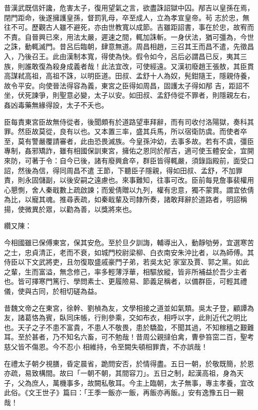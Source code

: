 \begin{pinyinscope}
 昔漢武既信奸讒，危害太子，復用望氣之言，欲盡誅詔獄中囚。邴吉以皇孫在焉，閉門距命，後遂擁護皇孫，督罰乳母，卒至成人，立為孝宣皇帝。茍
 志於忠，無往不可。歷觀古人雖不避死，亦由世教寬以成節。吉雖距詔書，事在於忠，故宥而不責。自晉興已來，用法太嚴，遲速之間，輒加誅斬。一身伏法，猶可彊為，今世之誅，動輒滅門。昔呂后臨朝，肆意無道。周昌相趙，三召其王而昌不遣，先徵昌入，乃後召王。此由漢制本寬，得使為快。假令如今，呂后必謂昌已反，夷其三族，則誰敢復為殺身成義者哉！此法宜改，可使經遠。又漢初廢趙王張敖，其臣貫高謀弒高祖，高祖不誅，以明臣道。田叔、孟舒十人為奴，髡鉗隨王，隱親侍養，故令平安。向使晉法得容為義，東宮之臣得如周昌，固護太子得如邴
 吉，距詔不坐，伏死諫爭，則聖意必變，太子以安。如田叔、孟舒侍從不罪者，則隱親左右，姦凶毒藥無緣得設，太子不夭也。



 臣每責東宮臣故無侍從者，後聞頗有於道路望車拜辭，而有司收付洛陽獄，奏科其罪。然臣故莫從，良有以也。又本置三率，盛其兵馬，所以宿衛防虞。而使者卒至，莫有警嚴覆請審者，此由恐畏滅族。今皇孫沖幼，去事多故。若有不虞，彊臣專制，姦邪矯詐，雖有相國保訓東宮，擁佑之恩同於邴吉，適可使玉體安全，宜開來防，可著于令：自今已後，諸有廢興倉卒，群臣皆得輒嚴，須錄詣殿前，面受口詔，然後為信，得同周昌不遣
 王節，下聽臣子隱親，得如田叔、孟舒，不加罪責，則永固儲副，以後安嗣之遠慮也。來事難知，往事可改。臣前每見詹事裴權用心懇惻，舍人秦戢數上疏啟諫；而爰倩贈以九列，權有忠意，獨不蒙賞。謂宜依倩為比，以寵其魂。推尋表疏，如秦戢輩及司隸所奏，諸敢拜辭於道路者，明詔稱揚，使微異於眾，以勸為善，以獎將來也。



 纘又陳：



 今相國雖已保傅東宮，保其安危。至於旦夕訓誨，輔導出入，動靜劬勞，宜選寒苦之士，忠貞清正，老而不衰，如城門校尉梁柳、白衣南安朱沖比者，以為師傅。其侍臣以下文武將吏，且勿復取盛戚豪門子弟，若吳太妃
 家室及賈、郭之黨。如此之輩，生而富溢，無念修己，率多輕薄浮華，相驅放縱，皆非所補益於吾少主者也。皆可擇寒門篤行、學問素士、更履險易、節義足稱者，以備群臣，可輕其禮儀，使與古同，於相切磋為益。



 昔魏文帝之在東宮，徐幹、劉楨為友，文學相接之道並如氣類。吳太子登，顧譚為友，諸葛恪為賓，臥同床帳，行則參乘，交如布衣，相呼以字，此則近代之明比也。天子之子不患不富貴，不患人不敬畏，患於驕盈，不聞其過，不知稼穡之艱難耳。至於甚者，乃不知名六畜，可不勉哉！昔周公親撻伯禽，曹參笞窋二百，聖考慈父皆不傷恩。今不忍小
 相維持，令至闕失頓相罪責，不亦誤哉！



 在禮太子朝夕視膳，昏定晨省，跪問安否，於情得盡。五日一朝，於敬既簡，於恩亦疏，易致構間。故曰「一朝不朝，其間容刀」。五日之制，起漢高祖，身為天子，父為庶人，萬機事多，故闕私敬耳。今主上臨朝，太子無事，專主孝養，宜改此俗。《文王世子》篇曰：「王季一飯亦一飯，再飯亦再飯。」安有逸豫五日一覲哉！




\end{pinyinscope}
